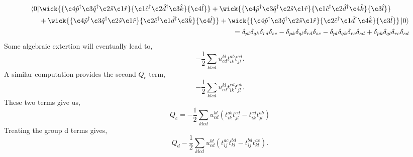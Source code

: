 \begin{align}
    \begin{aligned}
        \bra{0}&
        \wick{
        \{\c4{\hat{p}}^\dagger \c3{\hat{q}}^\dagger \c2{\hat{s}} \c1{\hat{r}}\}
        \{\c1{\hat{c}}^\dagger \c2{\hat{d}}^\dagger \c3{\hat{k}} \}
        \{\c4{\hat{l}} \}
        }
        +
        \wick{
        \{\c4{\hat{p}}^\dagger \c3{\hat{q}}^\dagger \c2{\hat{s}} \c1{\hat{r}}\}
        \{\c1{\hat{c}}^\dagger \c2{\hat{d}}^\dagger \c4{\hat{k}} \}
        \{\c3{\hat{l}} \}
        } \\
        &+
        \wick{
        \{\c4{\hat{p}}^\dagger \c3{\hat{q}}^\dagger \c2{\hat{s}} \c1{\hat{r}}\}
        \{\c2{\hat{c}}^\dagger \c1{\hat{d}}^\dagger \c3{\hat{k}} \}
        \{\c4{\hat{l}} \}
        }
        +
        \wick{
        \{\c4{\hat{p}}^\dagger \c3{\hat{q}}^\dagger \c2{\hat{s}} \c1{\hat{r}}\}
        \{\c2{\hat{c}}^\dagger \c1{\hat{d}}^\dagger \c4{\hat{k}} \}
        \{\c3{\hat{l}} \}
        } \ket{0}
    \end{aligned} \\
    = \delta_{pl} \delta_{qk} \delta_{rd} \delta_{sc}
    - \delta_{pk} \delta_{ql} \delta_{rd} \delta_{sc}
    - \delta_{pl} \delta_{qk} \delta_{rc} \delta_{sd}
    + \delta_{pk} \delta_{ql} \delta_{rc} \delta_{sd}
\end{align}
Some algebraic extertion will eventually lead to,
\begin{equation}
    - \frac{1}{2} \sum_{klcd} u^{kl}_{cd}
        t^{ab}_{ik} t^{cd}_{jl}.
\end{equation}
A similar computation provides the second $Q_c$ term,
\begin{equation}
    - \frac{1}{2} \sum_{klcd} u^{kl}_{cd}
        t^{cd}_{ik} t^{ab}_{jl}.
\end{equation}
These two terms give us,
\begin{equation}
    Q_c = - \frac{1}{2} \sum_{klcd} u^{kl}_{cd}
        (t^{ab}_{ik}t^{cd}_{jl} - t^{cd}_{ik}t^{ab}_{jl})
\end{equation}
Treating the group d terms gives,
\begin{equation}
    Q_d - \frac{1}{2} \sum_{klcd} u^{kl}_{cd}
        (t^{ac}_{ij}t^{bd}_{kl} - t^{bd}_{ij}t^{ac}_{kl}).
\end{equation}

